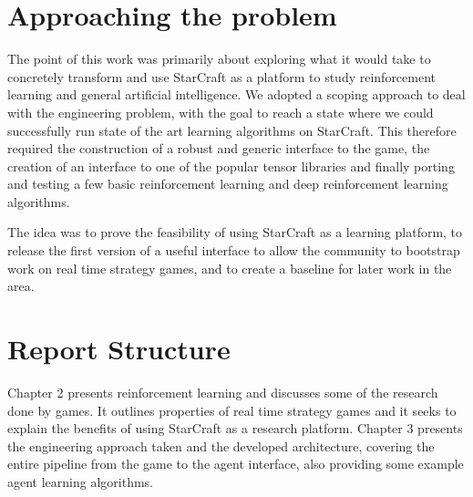 




\section{Approaching the problem} %

The point of this work was primarily about exploring what it would take to
concretely transform and use StarCraft as a platform to study reinforcement
learning and general artificial intelligence. We adopted a scoping approach to
deal with the engineering problem, with the goal to reach a state where we could
successfully run state of the art learning algorithms on StarCraft. This
therefore required the construction of a robust and generic interface to the
game, the creation of an interface to one of the popular tensor libraries and
finally porting and testing a few basic reinforcement learning and deep
reinforcement learning algorithms.

The idea was to prove the feasibility of using StarCraft as a learning platform,
to release the first version of a useful interface to allow the community to
bootstrap work on real time strategy games, and to create a baseline for later
work in the area.

\section{Report Structure}

Chapter 2 presents reinforcement learning and discusses some of the research
done by games. It outlines properties of real time strategy games and it seeks
to explain the benefits of using StarCraft as a research platform. Chapter 3
presents the engineering approach taken and the developed architecture, covering
the entire pipeline from the game to the agent interface, also providing some
example agent learning algorithms.
